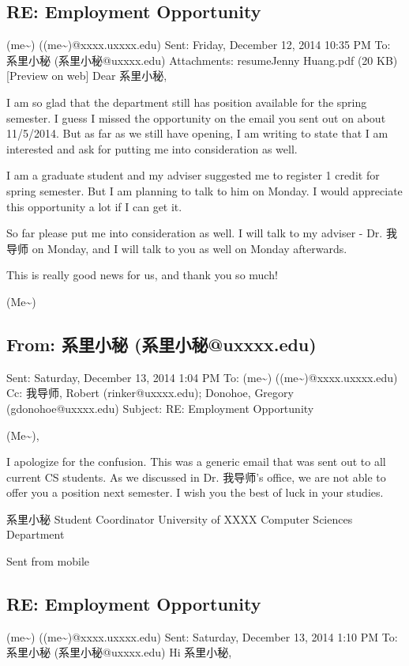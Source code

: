\documentclass[12pt]{book}
\begin{document}
\subsection{RE: Employment Opportunity}
\label{sec-36-1-2}
(me\textasciitilde{}) ((me\textasciitilde{})@xxxx.uxxxx.edu)
Sent:        Friday, December 12, 2014 10:35 PM
To:        
系里小秘 (系里小秘@uxxxx.edu)
Attachments:        
resume\textunderscore Jenny Huang.pdf‎ (20 KB‎)[Preview on web]
Dear 系里小秘, 

I am so glad that the department still has position available for the spring semester. I guess I missed the opportunity on the email you sent out on about 11/5/2014. But as far as we still have opening, I am writing to state that I am interested and ask for putting me into consideration as well. 

I am a graduate student and my adviser suggested me to register 1 credit for spring semester. But I am planning to talk to him on Monday. I would appreciate this opportunity a lot if I can get it. 

So far please put me into consideration as well. I will talk to my adviser - Dr. 我导师 on Monday, and I will talk to you as well on Monday afterwards. 

This is really good news for us, and thank you so much!

(Me\textasciitilde{})
\subsection{From: 系里小秘 (系里小秘@uxxxx.edu)}
\label{sec-36-1-3}
Sent: Saturday, December 13, 2014 1:04 PM
To: (me\textasciitilde{}) ((me\textasciitilde{})@xxxx.uxxxx.edu)
Cc: 我导师, Robert (rinker@uxxxx.edu); Donohoe, Gregory (gdonohoe@uxxxx.edu)
Subject: RE: Employment Opportunity

(Me\textasciitilde{}),

I apologize for the confusion. This was a generic email that was sent out to all current CS students. As we discussed in Dr. 我导师's office, we are not able to offer you a position next semester. I wish you the best of luck in your studies.

系里小秘
Student Coordinator
University of XXXX
Computer Sciences Department

Sent from mobile
\subsection{RE: Employment Opportunity}
\label{sec-36-1-4}
(me\textasciitilde{}) ((me\textasciitilde{})@xxxx.uxxxx.edu)
Sent:        Saturday, December 13, 2014 1:10 PM
To:        
系里小秘 (系里小秘@uxxxx.edu)
Hi 系里小秘, 
\end{document}
